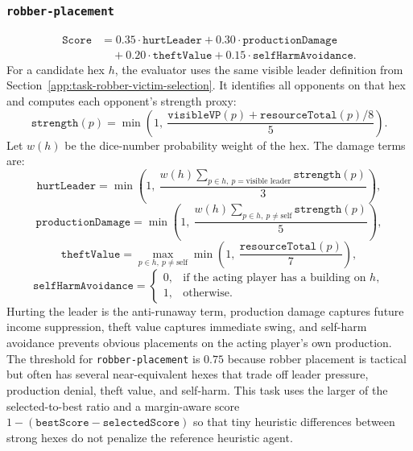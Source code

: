 \documentclass{article}
\begin{document}
\subsubsection{\texttt{robber-placement}}
\label{app:task-robber-placement}
\[
\begin{aligned}
\texttt{Score}
&= 0.35 \cdot \texttt{hurtLeader}
+ 0.30 \cdot \texttt{productionDamage} \\
&\quad + 0.20 \cdot \texttt{theftValue}
+ 0.15 \cdot \texttt{selfHarmAvoidance}.
\end{aligned}
\]
For a candidate hex $h$, the evaluator uses the same visible leader definition from Section~\ref{app:task-robber-victim-selection}. It identifies all opponents on that hex and computes each opponent's strength proxy:
\[
\texttt{strength}(p)
= \min\left(1,\ \frac{\texttt{visibleVP}(p) + \texttt{resourceTotal}(p)/8}{5}\right).
\]
Let $w(h)$ be the dice-number probability weight of the hex. The damage terms are:
\[
\texttt{hurtLeader}
= \min\left(1,\ \frac{w(h) \sum_{p \in h,\ p=\text{visible leader}}\texttt{strength}(p)}{3}\right),
\]
\[
\texttt{productionDamage}
= \min\left(1,\ \frac{w(h) \sum_{p \in h,\ p \ne \text{self}}\texttt{strength}(p)}{5}\right),
\]
\[
\texttt{theftValue}
= \max_{p \in h,\ p \ne \text{self}}\min\left(1,\ \frac{\texttt{resourceTotal}(p)}{7}\right),
\]
\[
\texttt{selfHarmAvoidance}
=
\begin{cases}
0, & \text{if the acting player has a building on } h,\\
1, & \text{otherwise}.
\end{cases}
\]
Hurting the leader is the anti-runaway term, production damage captures future income suppression, theft value captures immediate swing, and self-harm avoidance prevents obvious placements on the acting player's own production.
\\
The threshold for \texttt{robber-placement} is $0.75$ because robber placement is tactical but often has several near-equivalent hexes that trade off leader pressure, production denial, theft value, and self-harm. This task uses the larger of the selected-to-best ratio and a margin-aware score $1-(\texttt{bestScore}-\texttt{selectedScore})$ so that tiny heuristic differences between strong hexes do not penalize the reference heuristic agent.
\end{document}
